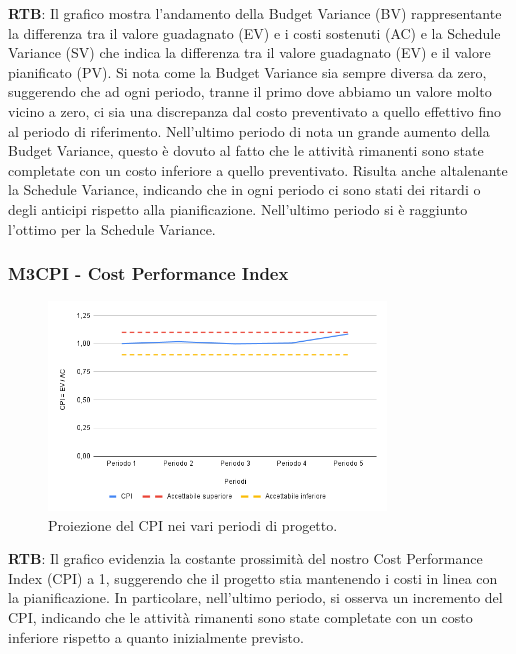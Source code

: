 \textbf{RTB}: Il grafico mostra l'andamento della Budget Variance (BV) rappresentante la differenza tra il valore guadagnato (EV) e i costi sostenuti (AC) e la Schedule Variance (SV) che indica la differenza tra il valore guadagnato (EV) e il valore pianificato (PV). Si nota come la Budget Variance sia sempre diversa da zero, suggerendo che ad ogni periodo, tranne il primo dove abbiamo un valore molto vicino a zero, ci sia una discrepanza dal costo preventivato a quello effettivo fino al periodo di riferimento. Nell'ultimo periodo di nota un grande aumento della Budget Variance, questo è dovuto al fatto che le attività rimanenti sono state completate con un costo inferiore a quello preventivato. 
Risulta anche altalenante la Schedule Variance, indicando che in ogni periodo ci sono stati dei ritardi o degli anticipi rispetto alla pianificazione. Nell'ultimo periodo si è raggiunto l'ottimo per la Schedule Variance. 

\subsubsection{M3CPI - Cost Performance Index}
\begin{figure}[H]
    \centering
    \includegraphics[width=0.8\textwidth]{../Images/PianoDiQualifica/M3CPI.png}
    \caption{Proiezione del CPI nei vari periodi di progetto.}
    \label{fig:5}
\end{figure}

\textbf{RTB}: Il grafico evidenzia la costante prossimità del nostro Cost Performance Index (CPI) a 1, suggerendo che il progetto stia mantenendo i costi in linea con la pianificazione. In particolare, nell'ultimo periodo, si osserva un incremento del CPI, indicando che le attività rimanenti sono state completate con un costo inferiore rispetto a quanto inizialmente previsto.

